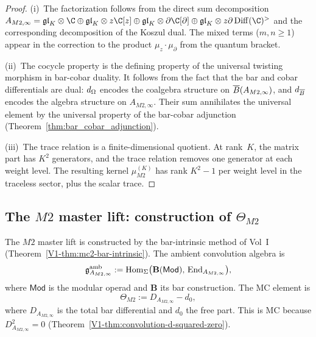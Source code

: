 \begin{proof}
(i)~The factorization follows from the direct sum decomposition
$A_{M2,\infty}
= \mathfrak{gl}_K\otimes\C\oplus\mathfrak{gl}_K\otimes z\C[z]
\oplus\mathfrak{gl}_K\otimes\partial\C[\partial]
\oplus\mathfrak{gl}_K\otimes z\partial\Diff(\C)^{>}$
and the corresponding decomposition of the Koszul dual. The
mixed terms ($m,n\ge 1$) appear in the correction to the
product $\mu_z\cdot\mu_\partial$ from the quantum bracket.

(ii)~The cocycle property is the defining property of the
universal twisting morphism in bar-cobar duality. It follows
from the fact that the bar and cobar differentials are dual:
$d_{\operatorname{\Omega}}$ encodes the coalgebra structure on $\overline{B}(A_{M2,\infty})$,
and $d_{\overline{B}}$ encodes the algebra structure on $A_{M2,\infty}$.
Their sum annihilates the universal element by the universal
property of the bar-cobar adjunction
(Theorem~\ref{thm:bar_cobar_adjunction}).

(iii)~The trace relation is a finite-dimensional quotient.
At rank~$K$, the matrix part has $K^2$ generators, and the
trace relation removes one generator at each weight level.
The resulting kernel $\mu_{M2}^{(K)}$ has rank $K^2-1$ per
weight level in the traceless sector, plus the scalar trace.
\end{proof}


\subsection{The \texorpdfstring{$M2$}{M2} master lift: construction of \texorpdfstring{$\Theta_{M2}$}{Theta\_\{M2\}}}

\begin{construction}
The $M2$ master lift is constructed by the bar-intrinsic method
of Vol~I (Theorem~\ref*{V1-thm:mc2-bar-intrinsic}). The ambient
convolution algebra is
\[
\mathfrak{g}^{\mathrm{amb}}_{A_{M2,\infty}}
:=
\operatorname{Hom}_{\Sigma}\bigl(
\mathbf{B}(\mathsf{Mod}),\,
\operatorname{End}_{A_{M2,\infty}}
\bigr),
\]
where $\mathsf{Mod}$ is the modular operad and $\mathbf{B}$
its bar construction. The MC element is
\begin{equation}%
\Theta_{M2}
:= D_{A_{M2,\infty}} - d_0,
\end{equation}
where $D_{A_{M2,\infty}}$ is the total bar differential and
$d_0$ the free part. This is MC because
$D_{A_{M2,\infty}}^2 = 0$
(Theorem~\ref*{V1-thm:convolution-d-squared-zero}).
\end{construction}

